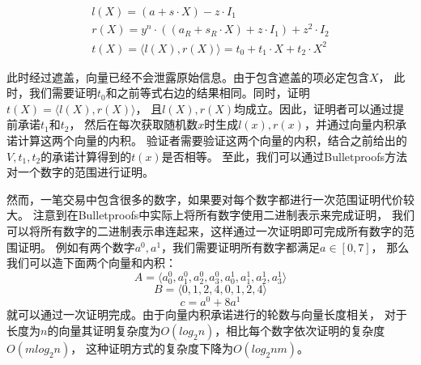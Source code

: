 $$
\begin{array}{l}
l(X)=\left(a+s \cdot X\right)-z \cdot I_1  \\
r(X)=y^n \cdot\left(\left(a_{R}+s_{R} \cdot X\right)+z \cdot I_1\right)+z^{2} \cdot I_2  \\
t(X)=\langle l(X), r(X)\rangle=t_{0}+t_{1} \cdot X+t_{2} \cdot X^{2} 
\end{array}
$$

此时经过遮盖，向量已经不会泄露原始信息。由于包含遮盖的项必定包含$X$，
此时，我们需要证明$t_0$和之前等式右边的结果相同。同时，证明$t(X)=\langle l(X), r(X)\rangle$，
且$l(X), r(X)$均成立。因此，证明者可以通过提前承诺$t_1$和$t_2$，
然后在每次获取随机数$x$时生成$l(x), r(x)$，并通过向量内积承诺计算这两个向量的内积。
验证者需要验证这两个向量的内积，结合之前给出的$V, t_1, t_2$的承诺计算得到的$t(x)$是否相等。
至此，我们可以通过Bulletproofs方法对一个数字的范围进行证明。

然而，一笔交易中包含很多的数字，如果要对每个数字都进行一次范围证明代价较大。
注意到在Bulletproofs中实际上将所有数字使用二进制表示来完成证明，
我们可以将所有数字的二进制表示串连起来，这样通过一次证明即可完成所有数字的范围证明。
例如有两个数字$a^0, a^1$，我们需要证明所有数字都满足$a\in[0, 7]$，
那么我们可以造下面两个向量和内积：
%
$$A=\langle a^0_0, a^0_1, a^0_2, a^0_3, a^1_0, a^1_1, a^1_2, a^1_3 \rangle$$
%
$$B = \langle 0, 1, 2, 4, 0, 1, 2, 4\rangle$$
%
$$c=a^0 + 8 a^1$$
%
就可以通过一次证明完成。由于向量内积承诺进行的轮数与向量长度相关，
对于长度为$n$的向量其证明复杂度为$O(log_2n)$，相比每个数字依次证明的复杂度$O(mlog_2n)$，
这种证明方式的复杂度下降为$O(log_2nm)$。

